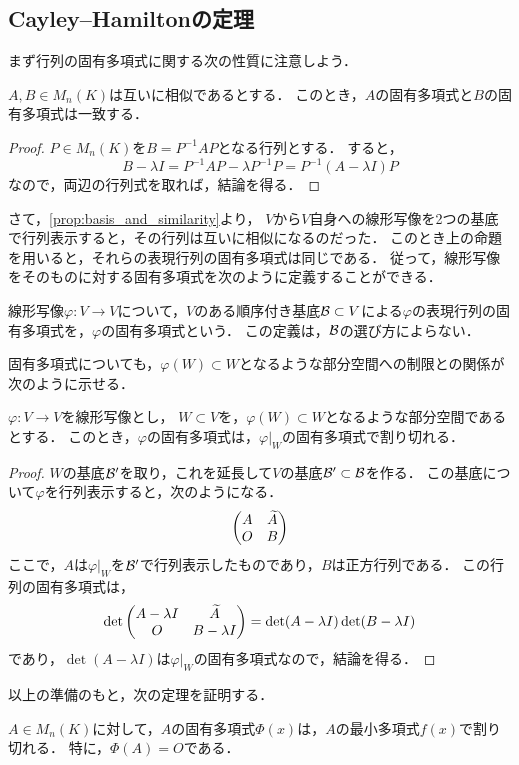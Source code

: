 \subsection{Cayley--Hamiltonの定理}
まず行列の固有多項式に関する次の性質に注意しよう．
\begin{prop}
$A,B\in M_n(K)$は互いに相似であるとする．
このとき，$A$の固有多項式と$B$の固有多項式は一致する．
\end{prop}
\begin{proof}
$P \in M_n(K)$を$B = P^{-1}AP$となる行列とする．
すると，
\[
    B-\lambda I = P^{-1}AP-\lambda P^{-1}P = P^{-1}(A-\lambda I) P   
\]
なので，両辺の行列式を取れば，結論を得る．
\end{proof}
さて，\cref{prop:basis_and_similarity}より，
$V$から$V$自身への線形写像を2つの基底で行列表示すると，その行列は互いに相似になるのだった．
このとき上の命題を用いると，それらの表現行列の固有多項式は同じである．
従って，線形写像をそのものに対する固有多項式を次のように定義することができる．
\begin{dfn}
線形写像$\varphi \colon V \to V$について，$V$のある順序付き基底$\mathcal{B} \subset V$による$\varphi$の表現行列の固有多項式を，$\varphi$の固有多項式という．
この定義は，$\mathcal{B}$の選び方によらない．
\end{dfn}
固有多項式についても，$\varphi(W)\subset W$となるような部分空間への制限との関係が次のように示せる．
\begin{prop}\label{prop:char_subspace}
$\varphi \colon V \to V$を線形写像とし，
$W \subset V$を，$\varphi(W) \subset W$となるような部分空間であるとする．
このとき，$\varphi$の固有多項式は，$\varphi|_W$の固有多項式で割り切れる．
\end{prop}
\begin{proof}
$W$の基底$\mathcal{B}'$を取り，これを延長して$V$の基底$\mathcal{B}' \subset \mathcal{B}$を作る．
この基底について$\varphi$を行列表示すると，次のようになる．
\[
    \begin{pmatrix} 
        A & \widetilde{A} \\
        O & B
     \end{pmatrix}    
\]
ここで，$A$は$\varphi|_W$を$\mathcal{B}'$で行列表示したものであり，$B$は正方行列である．
この行列の固有多項式は，
\[
    \det \begin{pmatrix} 
        A - \lambda I & \widetilde{A} \\
        O & B - \lambda I
     \end{pmatrix} = \det (A -\lambda I) \det(B-\lambda I)
\]
であり，$\det (A - \lambda I)$は$\varphi|_W$の固有多項式なので，結論を得る．
\end{proof}
以上の準備のもと，次の定理を証明する．
\begin{thm}
$A \in M_n(K)$に対して，$A$の固有多項式$\Phi(x)$は，$A$の最小多項式$f(x)$で割り切れる．
特に，$\Phi(A) = O$である．
\end{thm}
